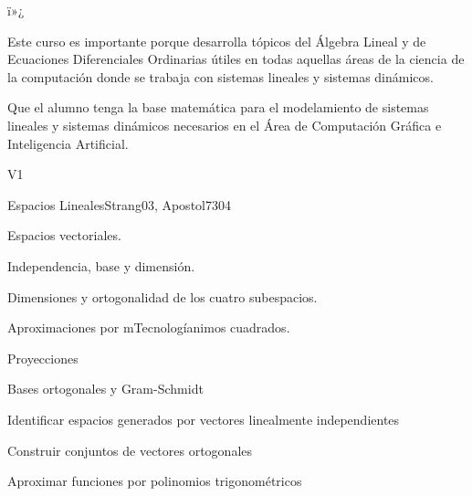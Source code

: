 ï»¿ \begin{syllabus}


\begin{justification}
Este curso es importante porque desarrolla tópicos del Álgebra Lineal y de Ecuaciones Diferenciales Ordinarias útiles en todas aquellas áreas de la ciencia de la computación donde se trabaja con sistemas lineales y sistemas dinámicos.
\end{justification}

\begin{goals}
\item Que el alumno tenga la base matemática para el modelamiento de sistemas lineales y sistemas dinámicos necesarios en el Área de Computación Gráfica e Inteligencia Artificial.
\end{goals}

\begin{outcomes}{V1}
   \item {}
   \item {}
   \item {}
\end{outcomes}

\begin{unit}{Espacios Lineales}{}{Strang03, Apostol73}{0}{4}
\begin{topics}
      \item Espacios vectoriales.
      \item Independencia, base y dimensión.
      \item Dimensiones y ortogonalidad de los cuatro subespacios.
      \item Aproximaciones por mTecnologíanimos cuadrados.
      \item Proyecciones
      \item Bases ortogonales y Gram-Schmidt
   \end{topics}

   \begin{learningoutcomes}
      \item Identificar espacios generados por vectores linealmente independientes
      \item Construir conjuntos de vectores ortogonales
      \item Aproximar funciones por polinomios trigonométricos
   \end{learningoutcomes}
\end{unit}


\end{syllabus}
